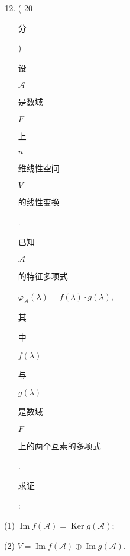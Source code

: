 \documentclass[10pt]{article}
\begin{document}
\begin{enumerate}
  \setcounter{enumi}{11}
  \item ( 20 \begin{CJK}{UTF8}{mj}分\end{CJK}) \begin{CJK}{UTF8}{mj}设\end{CJK} $\mathscr{A}$ \begin{CJK}{UTF8}{mj}是数域\end{CJK} $F$ \begin{CJK}{UTF8}{mj}上\end{CJK} $n$ \begin{CJK}{UTF8}{mj}维线性空间\end{CJK} $V$ \begin{CJK}{UTF8}{mj}的线性变换\end{CJK}. \begin{CJK}{UTF8}{mj}已知\end{CJK} $\mathscr{A}$ \begin{CJK}{UTF8}{mj}的特征多项式\end{CJK} $\varphi_{\mathscr{A}}(\lambda)=f(\lambda) \cdot g(\lambda)$, \begin{CJK}{UTF8}{mj}其\end{CJK} \begin{CJK}{UTF8}{mj}中\end{CJK} $f(\lambda)$ \begin{CJK}{UTF8}{mj}与\end{CJK} $g(\lambda)$ \begin{CJK}{UTF8}{mj}是数域\end{CJK} $F$ \begin{CJK}{UTF8}{mj}上的两个互素的多项式\end{CJK}. \begin{CJK}{UTF8}{mj}求证\end{CJK}:
\end{enumerate}
(1) $\operatorname{Im} f(\mathscr{A})=\operatorname{Ker} g(\mathscr{A})$;

(2) $V=\operatorname{Im} f(\mathscr{A}) \oplus \operatorname{Im} g(\mathscr{A})$.
\end{document}
